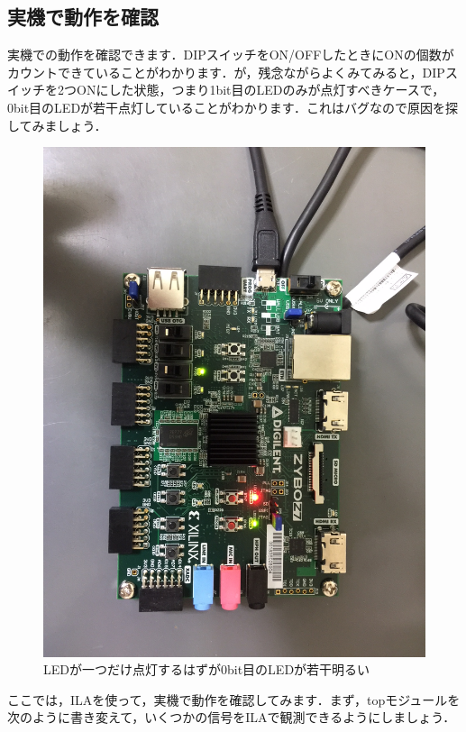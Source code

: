 \documentclass[a4paper,dvipdfmx]{jsarticle}
\begin{document}
 \subsection{実機で動作を確認}

実機での動作を確認できます．DIPスイッチをON/OFFしたときにONの個数がカウントできていることがわかります．が，残念ながらよくみてみると，DIPスイッチを2つONにした状態，つまり1bit目のLEDのみが点灯すべきケースで，0bit目のLEDが若干点灯していることがわかります．これはバグなので原因を探してみましょう．
 \begin{figure}[H]
  \begin{center}
   \includegraphics[width=.8\textwidth]{chapter08_figures/IMG_0011.JPG}
  \end{center}
  \caption{LEDが一つだけ点灯するはずが0bit目のLEDが若干明るい}
 \end{figure}

ここでは，ILAを使って，実機で動作を確認してみます．まず，topモジュールを次のように書き変えて，いくつかの信号をILAで観測できるようにしましょう．
\end{document}
